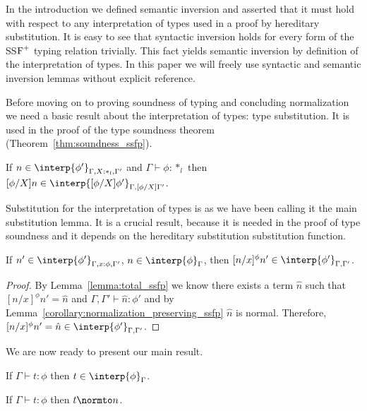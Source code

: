 In the introduction we defined semantic inversion and asserted that it
must hold with respect to any interpretation of types used in a proof
by hereditary substitution.  It is easy to see that syntactic
inversion holds for every form of the SS$\mbox{F}^{+}$ typing relation
trivially.  This fact yields semantic inversion by definition of the
interpretation of types.  In this paper we will freely use syntactic
and semantic inversion lemmas without explicit reference.

Before moving on to proving soundness of typing and concluding
normalization we need a basic result about the interpretation of
types: type substitution.  It is used in the proof of the type
soundness theorem (Theorem~\ref{thm:soundness_ssfp}).

\begin{lemma}
  If $n \in \interp{\phi'}_{\Gamma,X:*_l,\Gamma'}$ and 
  $\Gamma \vdash \phi:*_l$ then 
  $[\phi/X]n \in \interp{[\phi/X]\phi'}_{\Gamma,[\phi/X]\Gamma'}$.
  \label{lemma:type_sub_ssfp}
\end{lemma}

Substitution for the interpretation of types is as we have been
calling it the main substitution lemma.  It is a crucial result,
because it is needed in the proof of type soundness and it depends on
the hereditary substitution substitution function.

\begin{lemma}
  If $n' \in \interp{\phi'}_{\Gamma,x:\phi,\Gamma'}$, $n \in \interp{\phi}_\Gamma$, then 
  $[n/x]^\phi n' \in \interp{\phi'}_{\Gamma,\Gamma'}$.
  \label{lemma:interpretation_of_types_closed_substitution_ssfp}
\end{lemma}
\begin{proof}
  By Lemma~\ref{lemma:total_ssfp} we know there exists a term $\hat{n}$ 
  such that $[n/x]^\phi n' = \hat{n}$ and $\Gamma,\Gamma' \vdash \hat{n}:\phi'$ and by 
  Lemma~\ref{corollary:normalization_preserving_ssfp} $\hat{n}$ is normal.  Therefore,
  $[n/x]^\phi n' = \hat{n} \in \interp{\phi'}_{\Gamma,\Gamma'}$.
\end{proof}
\noindent
We are now ready to present our main result.

\begin{thm}
  If $\Gamma \vdash t:\phi$ then $t \in \interp{\phi}_\Gamma$.
  \label{thm:soundness_ssfp}
\end{thm}

\begin{corollary}[Normalization]
  If $\Gamma \vdash t:\phi$ then $t \normto n$.
\end{corollary}
